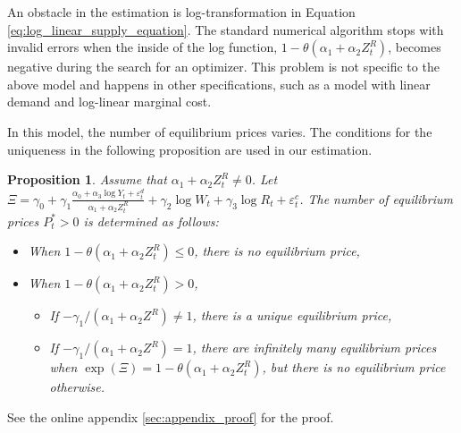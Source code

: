 \documentclass[11pt, a4paper]{article}
\newtheorem{proposition}{Proposition}
\begin{document}
An obstacle in the estimation is log-transformation in Equation \eqref{eq:log_linear_supply_equation}.
The standard numerical algorithm stops with invalid errors when the inside of the log function, $1 - \theta (\alpha_1 + \alpha_2 Z^{R}_{t})$, becomes negative during the search for an optimizer.
This problem is not specific to the above model and happens in other specifications, such as a model with linear demand and log-linear marginal cost.

In this model, the number of equilibrium prices varies. 
The conditions for the uniqueness in the following proposition are used in our estimation. 
\begin{proposition}\label{prop:equilibrium_existence}
    Assume that $\alpha_1 + \alpha_2 Z^{R}_{t}\ne 0$. Let $\Xi = \gamma_0 + \gamma_1\frac{\alpha_0 + \alpha_3 \log Y_t + \varepsilon^{d}_{t}}{\alpha_1 + \alpha_2 Z^{R}_{t}} +  \gamma_2 \log W_{t} + \gamma_3 \log R_t + \varepsilon^{c}_{t}$.
    The number of equilibrium prices $P_{t}^*>0$ is determined as follows:
    \begin{itemize}
        \item When $1 - \theta (\alpha_1 + \alpha_2 Z^{R}_{t}) \le 0$, there is no equilibrium price,
        \item When $1 - \theta (\alpha_1 + \alpha_2 Z^{R}_{t}) >0$, 
        \begin{itemize}
            \item If $-\gamma_1/(\alpha_1+\alpha_2 Z^R) \ne 1$, there is a unique equilibrium price,
            \item If $-\gamma_1/(\alpha_1+\alpha_2 Z^R) =1$, there are infinitely many equilibrium prices when $\exp(\Xi) = 1 - \theta (\alpha_1 + \alpha_2 Z^{R}_{t})$, but there is no equilibrium price otherwise.
        \end{itemize}
    \end{itemize}
\end{proposition}
See the online appendix \ref{sec:appendix_proof} for the proof.




\end{document}
